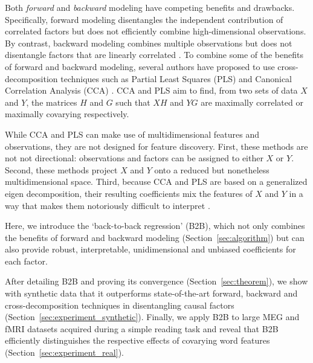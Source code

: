 Both \emph{forward} and \emph{backward} modeling have competing benefits and drawbacks.
Specifically, forward modeling disentangles the independent contribution of
correlated factors but does not efficiently combine high-dimensional observations. By
contrast, backward modeling combines multiple observations but does not
disentangle factors that are linearly correlated \citep{weichwald2015causal,
hebart2018deconstructing, king2018encoding}. To combine some of the benefits of forward
and backward modeling, several authors have proposed to use cross-decomposition
techniques such as Partial Least Squares (PLS) and Canonical Correlation
Analysis (CCA) \citep{de2019multiway, bilenko2016Pyrcca}. CCA and PLS aim to find, from two sets of
data $X$ and $Y$, the matrices $H$ and $G$ such that $XH$ and $YG$ are maximally
correlated or maximally covarying respectively.

While CCA and PLS can make use
of multidimensional features and observations, they are not designed
for feature discovery. First, these methods are not not directional: observations
and factors can be assigned to either $X$ or $Y$. Second, these methods project $X$
and $Y$ onto a reduced but nonetheless multidimensional space. Third, because
CCA and PLS are based on a generalized eigen decomposition, their resulting
coefficients mix the features of $X$ and $Y$ in a way that makes them notoriously difficult to
interpret \citep{lebart1995statistique}.

Here, we introduce the `back-to-back regression' (B2B), which not only combines
the benefits of forward and backward modeling (Section~\ref{sec:algorithm}) but
can also provide robust, interpretable, unidimensional and unbiased coefficients for
each factor.

After detailing B2B and proving its convergence
(Section~\ref{sec:theorem}), we show with synthetic data that it outperforms
state-of-the-art forward, backward and cross-decomposition techniques in
disentangling causal factors (Section~\ref{sec:experiment_synthetic}). Finally,
we apply B2B to large MEG and fMRI datasets acquired during a simple reading
task and reveal that B2B efficiently distinguishes the respective effects of
covarying word features (Section~\ref{sec:experiment_real}).
